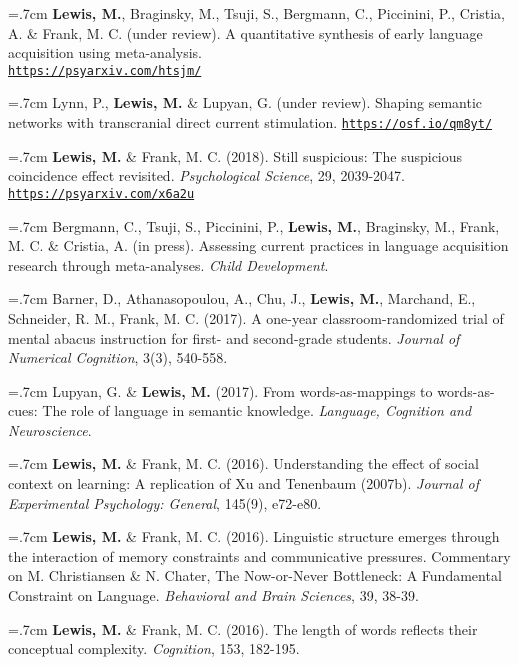 \documentclass[letterpaper]{article}
\begin{document}

\hangindent=.7cm {\bf Lewis, M.}, Braginsky, M., Tsuji, S., Bergmann, C., Piccinini, P., Cristia, A. \& Frank, M. C. (under review). A quantitative synthesis of early language acquisition using meta-analysis. \\ \href{https://psyarxiv.com/htsjm/}{\tt https://psyarxiv.com/htsjm/}

\hangindent=.7cm Lynn, P., {\bf Lewis, M.} \& Lupyan, G. (under review). Shaping semantic networks with transcranial direct current stimulation. \href{https://osf.io/qm8yt/}{\tt https://osf.io/qm8yt/}



\hangindent=.7cm {\bf Lewis, M.} \& Frank, M. C. (2018). Still suspicious: The suspicious coincidence effect revisited.  {\it Psychological Science}, 29, 2039-2047. \href{https://psyarxiv.com/x6a2u}{\tt https://psyarxiv.com/x6a2u}
  

\hangindent=.7cm Bergmann, C., Tsuji, S., Piccinini, P., {\bf Lewis, M.}, Braginsky, M., Frank, M. C. \& Cristia, A. (in press). Assessing current practices in language acquisition research through meta-analyses. {\it Child Development}.

\hangindent=.7cm Barner, D., Athanasopoulou, A., Chu, J., {\bf Lewis, M.}, Marchand, E., Schneider, R. M., Frank, M. C. (2017). A one-year classroom-randomized trial of mental abacus instruction for first- and second-grade students.  {\it Journal of Numerical Cognition}, 3(3), 540-558.
    

\hangindent=.7cm Lupyan, G. \& {\bf Lewis, M.} (2017). From words-as-mappings to words-as-cues: The role of language in semantic knowledge. {\it Language, Cognition and Neuroscience}.

  \hangindent=.7cm {\bf Lewis, M.} \& Frank, M. C. (2016). Understanding the effect of social context on learning: A replication of Xu and Tenenbaum (2007b). {\it Journal of Experimental Psychology: General}, 145(9), e72-e80.

 \hangindent=.7cm {\bf Lewis, M.} \& Frank, M. C. (2016). Linguistic structure emerges through the interaction of memory constraints and communicative pressures. Commentary on M. Christiansen \& N. Chater, The Now-or-Never Bottleneck: A Fundamental Constraint on Language. {\it Behavioral and Brain Sciences}, 39, 38-39.
 
  \hangindent=.7cm {\bf Lewis, M.} \& Frank, M. C. (2016). The length of words reflects their conceptual complexity. {\it Cognition}, 153, 182-195.
\end{document}
